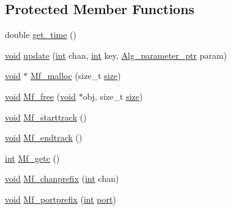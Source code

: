 \subsection*{Protected Member Functions}
\begin{DoxyCompactItemize}
\item 
double \hyperlink{class_alg__midifile__reader_a24cc3bc44d829f93c4a7da2da048a7c8}{get\+\_\+time} ()
\item 
\hyperlink{sound_8c_ae35f5844602719cf66324f4de2a658b3}{void} \hyperlink{class_alg__midifile__reader_aeb6451f3ade8be8385de45c52c1b3227}{update} (\hyperlink{xmltok_8h_a5a0d4a5641ce434f1d23533f2b2e6653}{int} chan, \hyperlink{xmltok_8h_a5a0d4a5641ce434f1d23533f2b2e6653}{int} key, \hyperlink{allegro_8h_a11b6679f8e1fe576476b10e4bc1f7240}{Alg\+\_\+parameter\+\_\+ptr} param)
\item 
\hyperlink{sound_8c_ae35f5844602719cf66324f4de2a658b3}{void} $\ast$ \hyperlink{class_alg__midifile__reader_a0bd02f8f213c63e032ddb01fad96fa20}{Mf\+\_\+malloc} (size\+\_\+t \hyperlink{group__lavu__mem_ga854352f53b148adc24983a58a1866d66}{size})
\item 
\hyperlink{sound_8c_ae35f5844602719cf66324f4de2a658b3}{void} \hyperlink{class_alg__midifile__reader_aa4247c4b55a513e63871a4d6e46c6bf0}{Mf\+\_\+free} (\hyperlink{sound_8c_ae35f5844602719cf66324f4de2a658b3}{void} $\ast$obj, size\+\_\+t \hyperlink{group__lavu__mem_ga854352f53b148adc24983a58a1866d66}{size})
\item 
\hyperlink{sound_8c_ae35f5844602719cf66324f4de2a658b3}{void} \hyperlink{class_alg__midifile__reader_a099f990f5b91cf272662eac1f75243e5}{Mf\+\_\+starttrack} ()
\item 
\hyperlink{sound_8c_ae35f5844602719cf66324f4de2a658b3}{void} \hyperlink{class_alg__midifile__reader_aa3cccc1d0660e5027082cab900bc87bf}{Mf\+\_\+endtrack} ()
\item 
\hyperlink{xmltok_8h_a5a0d4a5641ce434f1d23533f2b2e6653}{int} \hyperlink{class_alg__midifile__reader_a936c9db1cbee3c07f8db2e9e89493703}{Mf\+\_\+getc} ()
\item 
\hyperlink{sound_8c_ae35f5844602719cf66324f4de2a658b3}{void} \hyperlink{class_alg__midifile__reader_a7de49f070a5017d186ec753e1fa581db}{Mf\+\_\+chanprefix} (\hyperlink{xmltok_8h_a5a0d4a5641ce434f1d23533f2b2e6653}{int} chan)
\item 
\hyperlink{sound_8c_ae35f5844602719cf66324f4de2a658b3}{void} \hyperlink{class_alg__midifile__reader_aeece3e4dd8b34cb77dcb51ba6226f17b}{Mf\+\_\+portprefix} (\hyperlink{xmltok_8h_a5a0d4a5641ce434f1d23533f2b2e6653}{int} \hyperlink{class_alg__midifile__reader_ac4de4a69968bfc796de980ffc33855ac}{port})

\end{DoxyCompactItemize}
